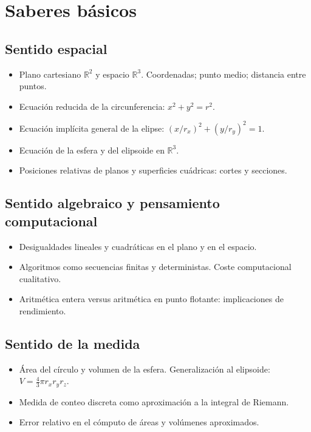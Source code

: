 \documentclass[12pt,a4paper]{scrartcl}
\begin{document}
\section{Saberes básicos}

\subsection{Sentido espacial}
\begin{itemize}[leftmargin=1.3em,itemsep=0.15em,topsep=0.3em]
  \item Plano cartesiano $\mathbb{R}^2$ y espacio $\mathbb{R}^3$. Coordenadas; punto medio; distancia entre puntos.
  \item Ecuación reducida de la circunferencia: $x^2 + y^2 = r^2$.
  \item Ecuación implícita general de la elipse: $\left(x/r_x\right)^2 + \left(y/r_y\right)^2 = 1$.
  \item Ecuación de la esfera y del elipsoide en $\mathbb{R}^3$.
  \item Posiciones relativas de planos y superficies cuádricas: cortes y secciones.
\end{itemize}

\subsection{Sentido algebraico y pensamiento computacional}
\begin{itemize}[leftmargin=1.3em,itemsep=0.15em,topsep=0.3em]
  \item Desigualdades lineales y cuadráticas en el plano y en el espacio.
  \item Algoritmos como secuencias finitas y deterministas. Coste computacional cualitativo.
  \item Aritmética entera versus aritmética en punto flotante: implicaciones de rendimiento.
\end{itemize}

\subsection{Sentido de la medida}
\begin{itemize}[leftmargin=1.3em,itemsep=0.15em,topsep=0.3em]
  \item Área del círculo y volumen de la esfera. Generalización al elipsoide: $V = \tfrac{4}{3}\pi r_x r_y r_z$.
  \item Medida de conteo discreta como aproximación a la integral de Riemann.
  \item Error relativo en el cómputo de áreas y volúmenes aproximados.
\end{itemize}
\end{document}
